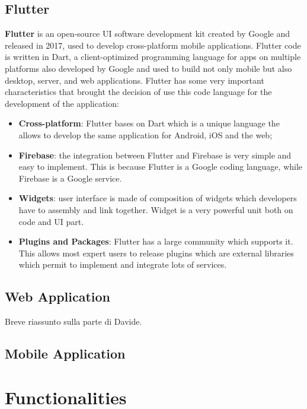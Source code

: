 \documentclass[oneside]{book}
\begin{document}
\section{Flutter}
\textbf{Flutter} is an open-source UI software development kit created by Google and released in 2017, used to develop cross-platform mobile applications. Flutter code is written in Dart, a client-optimized programming language for apps on multiple platforms also developed by Google and used to build not only mobile but also desktop, server, and web applications. Flutter has some very important characteristics that brought the decision of use this code language for the development of the application:
\begin{itemize}
\item \textbf{Cross-platform}: Flutter bases on Dart which is a unique language the allows to develop the same application for Android, iOS and the web;
\item \textbf{Firebase}: the integration between Flutter and Firebase is very simple and easy to implement. This is because Flutter is a Google coding language, while Firebase is a Google service. 
\item \textbf{Widgets}: user interface is made of composition of widgets which developers have to assembly and link together. Widget is a very powerful unit both on code and UI part.
\item \textbf{Plugins and Packages}: Flutter has a large community which supports it. This allows most expert users to release plugins which are external libraries which permit to implement and integrate lots of services.
\end{itemize}

\section{Web Application}
Breve riassunto sulla parte di Davide.

\section{Mobile Application}

\chapter{Functionalities}
\end{document}
